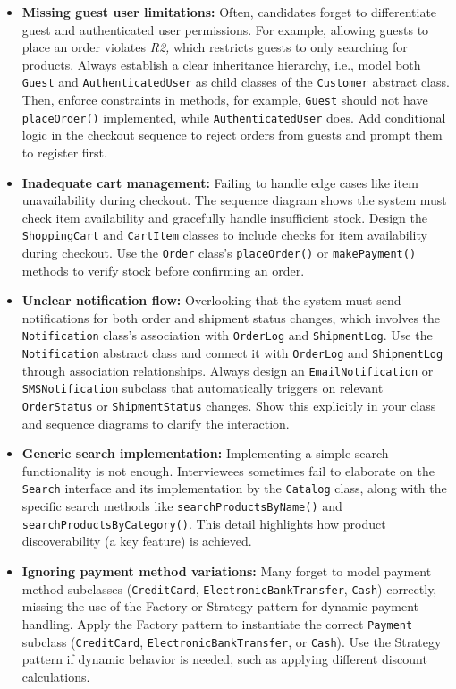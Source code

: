 \begin{itemize}
\item
\protect{}\label{GHf5cYoGk1uB2QjqLzxmX}
\textbf{Missing guest user limitations:} Often, candidates forget to differentiate guest and authenticated user permissions. For example, allowing guests to place an order violates \emph{R2,} which restricts guests to only searching for products. Always establish a clear inheritance hierarchy, i.e., model both \texttt{Guest} and \texttt{AuthenticatedUser} as child classes of the \texttt{Customer} abstract class. Then, enforce constraints in methods, for example, \texttt{Guest} should not have \texttt{placeOrder()} implemented, while \texttt{AuthenticatedUser} does. Add conditional logic in the checkout sequence to reject orders from guests and prompt them to register first.
\item
\protect{}\label{Rb1kFj6vvtbs0AZGoDrk8}
\textbf{Inadequate cart management:} Failing to handle edge cases like item unavailability during checkout. The sequence diagram shows the system must check item availability and gracefully handle insufficient stock. Design the \texttt{ShoppingCart} and \texttt{CartItem} classes to include checks for item availability during checkout. Use the \texttt{Order} class's \texttt{placeOrder()} or \texttt{makePayment()} methods to verify stock before confirming an order.
\item
\protect{}\label{hylIQcFv8VJVz55X0QHyz}
\textbf{Unclear notification flow:} Overlooking that the system must send notifications for both order and shipment status changes, which involves the \texttt{Notification} class's association with \texttt{OrderLog} and \texttt{ShipmentLog}. Use the \texttt{Notification} abstract class and connect it with \texttt{OrderLog} and \texttt{ShipmentLog} through association relationships. Always design an \texttt{EmailNotification} or \texttt{SMSNotification} subclass that automatically triggers on relevant \texttt{OrderStatus} or \texttt{ShipmentStatus} changes. Show this explicitly in your class and sequence diagrams to clarify the interaction.
\item
\protect{}\label{uDz4ZXSO3ZiHEPCTQiZeg}
\textbf{Generic search implementation:} Implementing a simple search functionality is not enough. Interviewees sometimes fail to elaborate on the \texttt{Search} interface and its implementation by the \texttt{Catalog} class, along with the specific search methods like \texttt{searchProductsByName()} and \texttt{searchProductsByCategory()}. This detail highlights how product discoverability (a key feature) is achieved.
\item
\protect{}\label{wZwWIPYVJ7vRlWOp9-xp2}
\textbf{Ignoring payment method variations:} Many forget to model payment method subclasses (\texttt{CreditCard}, \texttt{ElectronicBankTransfer}, \texttt{Cash}) correctly, missing the use of the Factory or Strategy pattern for dynamic payment handling. Apply the Factory pattern to instantiate the correct \texttt{Payment} subclass (\texttt{CreditCard}, \texttt{ElectronicBankTransfer}, or \texttt{Cash}). Use the Strategy pattern if dynamic behavior is needed, such as applying different discount calculations.
\end{itemize}

